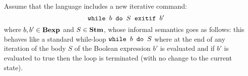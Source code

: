 \newcommand{\exitifSOS}{\SOSRule{exitif}{}{SOS}}
{Assume that the language \while{} includes a new iterative command:
$$
\mbox{\normalfont{\texttt{while }}} b \textrm{\normalfont{\texttt{ do }}} S \textrm{\normalfont{\texttt{ exitif }}} b'
$$
where $b, b' \in \mbox{\textbf{Bexp}}$ and $S \in \mbox{\textbf{Stm}}$, whose informal semantics goes as follows:
this behaves like a standard while-loop $\mbox{\normalfont{\texttt{while }}} b \textrm{\normalfont{\texttt{ do }}} S$ where at the end of any iteration
of the body $S$ of the Boolean expression $b'$ is evaluated and if $b'$ is evaluated
to true then the loop is terminated (with no change to the current state).
}
